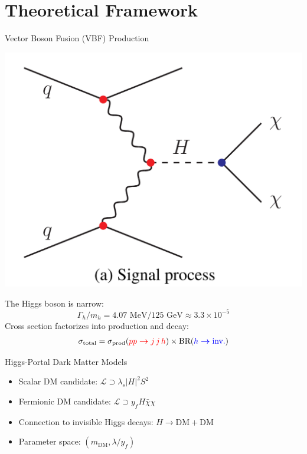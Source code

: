 \documentclass{../../bredelebeamer}
\begin{document}
\section{Theoretical Framework}
\begin{frame}{Vector Boson Fusion (VBF) Production}
    \begin{minipage}{0.38\textwidth}
        \begin{center}
            \includegraphics[width=\textwidth]{../Images/VBF.png}
        \end{center}
    \end{minipage}
    \hfill
    \begin{minipage}{0.6\textwidth}
        The Higgs boson is narrow: 
        \begin{equation*}
            \Gamma_h/m_h = 4.07 \text{ MeV}/125 \text{ GeV} \approx 3.3 \times 10^{-5}
        \end{equation*}
        Cross section factorizes into production and decay:
        \begin{multline*}
            \sigma_{\text{total}} = \sigma_{\text{prod}} (\textcolor{red}{pp\boldsymbol{\to}j\,j\, h})  \times \text{BR}(\textcolor{blue}{h \boldsymbol{\to} \text{inv.}})
        \end{multline*}
    \end{minipage}
\end{frame}


\begin{frame}{Higgs-Portal Dark Matter Models}
    \begin{itemize}
        \item Scalar DM candidate: $\mathcal{L} \supset \lambda_s |H|^2 S^2$
        \item Fermionic DM candidate: $\mathcal{L} \supset y_f H \bar{\chi} \chi$
        \item Connection to invisible Higgs decays: $H \to \text{DM} + \text{DM}$
        \item Parameter space: $(m_{\text{DM}}, \lambda/y_f)$
    \end{itemize}
\end{frame}
\end{document}

